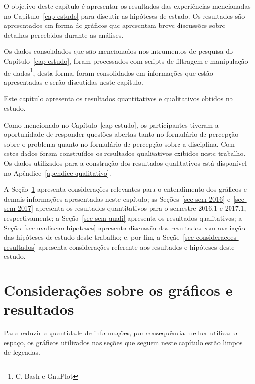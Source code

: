 

\label{cap-resultados}
\acresetall

O objetivo deste capítulo é apresentar os resultados das experiências
mencionadas no Capítulo~\ref{cap-estudo} para discutir as
hipóteses de estudo.
Os resultados são apresentados em forma de gráficos que apresentam
breve discussões sobre detalhes percebidos durante as análises.

Os dados consolidados que são mencionados nos intrumentos de pesquisa
do Capítulo~\ref{cap-estudo}, foram processados com
scripts de filtragem e manipulação
de dados\footnote{C, Bash e GnuPlot}, desta forma,
foram consolidados em informações que estão
apresentadas e serão discutidas neste capítulo.

Este capítulo apresenta os resultados quantitativos
e qualitativos obtidos no estudo.

Como mencionado no Capítulo~\ref{cap-estudo}, os participantes
tiveram a oportunidade de responder questões abertas tanto no
formulário de percepção sobre o problema quanto no formulário
de percepção sobre a disciplina.
Com estes dados foram construídos os resultados qualitativos
exibidos neste trabalho.
Os dados utilizados para a construção dos resultados
qualitativos está disponível no Apêndice~\ref{apendice-qualitativo}.

A Seção~\ref{sec-ref-graficos} apresenta considerações relevantes para o
entendimento dos gráficos e demais informações apresentadas neste capítulo;
as Seções~\ref{sec-sem-2016} e~\ref{sec-sem-2017}
apresenta os resultados quantitativos para o semestre 2016.1 e 2017.1, respectivamente;
a Seção~\ref{sec-sem-quali} apresenta os resultados qualitativos;
a Seção~\ref{sec-avaliacao-hipoteses} apresenta discussão dos resultados
com avaliação das hipóteses de estudo deste trabalho;
e, por fim, a Seção~\ref{sec-consideracoes-resultados} apresenta
considerações referente aos resultados e hipóteses
deste estudo.

\section{Considerações sobre os gráficos e resultados}
\label{sec-ref-graficos}
Para reduzir a quantidade de informações, por consequência melhor utilizar o
espaço, os gráficos utilizados nas seções que seguem neste capítulo
estão limpos de legendas.

